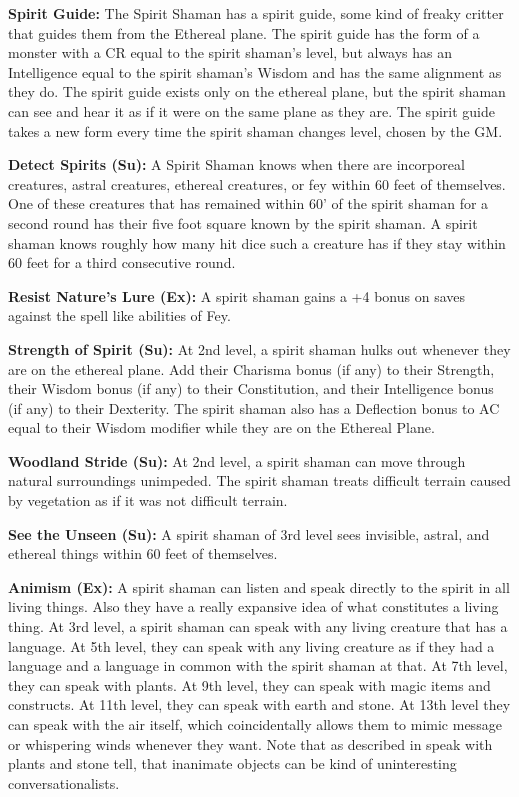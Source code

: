 \textbf{Spirit Guide:} The Spirit Shaman has a spirit guide, some kind of freaky critter that guides them from the Ethereal plane. The spirit guide has the form of a monster with a CR equal to the spirit shaman's level, but always has an Intelligence equal to the spirit shaman's Wisdom and has the same alignment as they do. The spirit guide exists only on the ethereal plane, but the spirit shaman can see and hear it as if it were on the same plane as they are. The spirit guide takes a new form every time the spirit shaman changes level, chosen by the GM.

\textbf{Detect Spirits (Su):} A Spirit Shaman knows when there are incorporeal creatures, astral creatures, ethereal creatures, or fey within 60 feet of themselves. One of these creatures that has remained within 60' of the spirit shaman for a second round has their five foot square known by the spirit shaman. A spirit shaman knows roughly how many hit dice such a creature has if they stay within 60 feet for a third consecutive round.

\textbf{Resist Nature's Lure (Ex):} A spirit shaman gains a +4 bonus on saves against the spell like abilities of Fey.

\textbf{Strength of Spirit (Su):} At 2nd level, a spirit shaman hulks out whenever they are on the ethereal plane. Add their Charisma bonus (if any) to their Strength, their Wisdom bonus (if any) to their Constitution, and their Intelligence bonus (if any) to their Dexterity. The spirit shaman also has a Deflection bonus to AC equal to their Wisdom modifier while they are on the Ethereal Plane.

\textbf{Woodland Stride (Su):} At 2nd level, a spirit shaman can move through natural surroundings unimpeded. The spirit shaman treats difficult terrain caused by vegetation as if it was not difficult terrain.

\textbf{See the Unseen (Su):} A spirit shaman of 3rd level sees invisible, astral, and ethereal things within 60 feet of themselves.

\textbf{Animism (Ex):} A spirit shaman can listen and speak directly to the spirit in all living things. Also they have a really expansive idea of what constitutes a living thing. At 3rd level, a spirit shaman can speak with any living creature that has a language. At 5th level, they can speak with any living creature as if they had a language and a language in common with the spirit shaman at that. At 7th level, they can speak with plants. At 9th level, they can speak with magic items and constructs. At 11th level, they can speak with earth and stone. At 13th level they can speak with the air itself, which coincidentally allows them to mimic message or whispering winds whenever they want. Note that as described in speak with plants and stone tell, that inanimate objects can be kind of uninteresting conversationalists.

